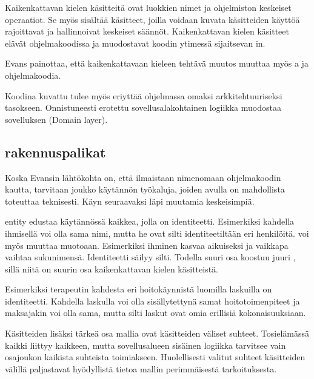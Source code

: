 Kaikenkattavan kielen käsitteitä ovat luokkien nimet ja ohjelmiston
keskeiset operaatiot. Se myös sisältää käsitteet, joilla voidaan kuvata
käsitteiden käyttöä rajoittavat ja hallinnoivat keskeiset säännöt.
Kaikenkattavan kielen käsitteet elävät ohjelmakoodissa ja muodostavat
koodin ytimessä sijaitsevan in.

Evans painottaa, että kaikenkattavaan kieleen tehtävä muutos muuttaa
myös a ja ohjelmakoodia.

Koodina kuvattu  tulee myös eriyttää
ohjelmassa omaksi arkkitehtuuriseksi tasokseen. Onnistuneesti erotettu
sovellusalakohtainen logiikka muodostaa sovelluksen
 (Domain layer).

\hypertarget{rakennuspalikat}{%
\subsection{\texorpdfstring{
rakennuspalikat}{ rakennuspalikat}}\label{rakennuspalikat}}

Koska Evansin lähtökohta on, että  ilmaistaan
nimenomaan ohjelmakoodin kautta, tarvitaan joukko käytännön työkaluja,
joiden avulla  on mahdollista toteuttaa
teknisesti. Käyn seuraavaksi läpi muutamia keskeisimpiä.

\Gls{entity} edustaa käytännössä kaikkea, jolla on identiteetti.
Esimerkiksi kahdella ihmisellä voi olla sama nimi, mutta he ovat silti
identiteetiltään eri henkilöitä.  voi myös muuttaa
muotoaan. Esimerkiksi ihminen kasvaa aikuiseksi ja vaikkapa vaihtaa
sukunimensä. Identiteetti säilyy silti. Todella suuri osa
 koostuu juuri
, sillä niitä on suurin osa
kaikenkattavan kielen käsitteistä.

Esimerkiksi terapeutin kahdesta eri hoitokäynnistä luomilla laskuilla on
identiteetti. Kahdella laskulla voi olla sisällytettynä samat
hoitotoimenpiteet ja maksajakin voi olla sama, mutta silti laskut ovat
omia erillisiä kokonaisuuksiaan.

Käsitteiden lisäksi tärkeä osa mallia ovat käsitteiden väliset suhteet.
Tosielämässä kaikki liittyy kaikkeen, mutta sovellusalueen sisäinen
logiikka tarvitsee vain osajoukon kaikista suhteista toimiakseen.
Huolellisesti valitut suhteet käsitteiden välillä paljastavat
hyödyllistä tietoa mallin perimmäisestä tarkoituksesta.

